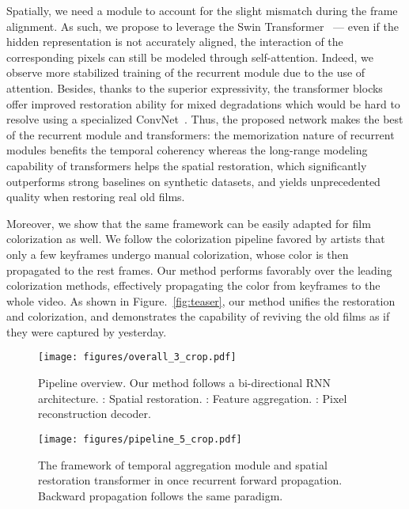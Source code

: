 \documentclass[10pt,twocolumn,letterpaper]{article}
\begin{document}
	Spatially, we need a module to account for the slight mismatch during the frame alignment. As such, we propose to leverage the Swin Transformer~\cite{Liu_2021_ICCV} --- even if the hidden representation is not accurately aligned, the interaction of the corresponding pixels can still be modeled through self-attention. Indeed, we observe more stabilized training of the recurrent module due to the use of attention. Besides, thanks to the superior expressivity, the transformer blocks offer improved restoration ability for mixed degradations which would be hard to resolve using a specialized ConvNet~\cite{yu2018crafting,suganuma2019attention}. Thus, the proposed network makes the best of the recurrent module and transformers: the memorization nature of recurrent modules benefits the temporal coherency whereas the long-range modeling capability of transformers helps the spatial restoration, which significantly outperforms strong baselines on synthetic datasets, and yields unprecedented quality when restoring real old films.
	
	
	Moreover, we show that the same framework can be easily adapted for film colorization as well. We follow the colorization pipeline favored by artists that only a few keyframes undergo manual colorization, whose color is then propagated to the rest frames. Our method performs favorably over the leading colorization methods, effectively propagating the color from keyframes to the whole video. As shown in Figure.~\ref{fig:teaser}, our method unifies the restoration and colorization, and demonstrates the capability of reviving the old films as if they were captured by yesterday.
	
	
	\begin{figure}[!t]
		\begin{center}
			\texttt{[image: figures/overall\_3\_crop.pdf]}
			\vspace{-1.4em}
			\caption{{Pipeline overview.} Our method follows a bi-directional RNN architecture. : Spatial restoration. : Feature aggregation. : Pixel reconstruction decoder.}
			\label{fig:overall_pipeline}
		\end{center}
		\vspace{-2.5em}
	\end{figure}
	
	
	\begin{figure*}[!t]
		\begin{center}
			\texttt{[image: figures/pipeline\_5\_crop.pdf]}
			\vspace{-1.4em}
			\caption{{The framework of temporal aggregation module  and spatial restoration transformer  in once recurrent forward propagation.} Backward propagation follows the same paradigm.}
			\label{fig:recurrent_pipeline}
		\end{center}
		\vspace{-2.0em}
	\end{figure*}
	
\end{document}
